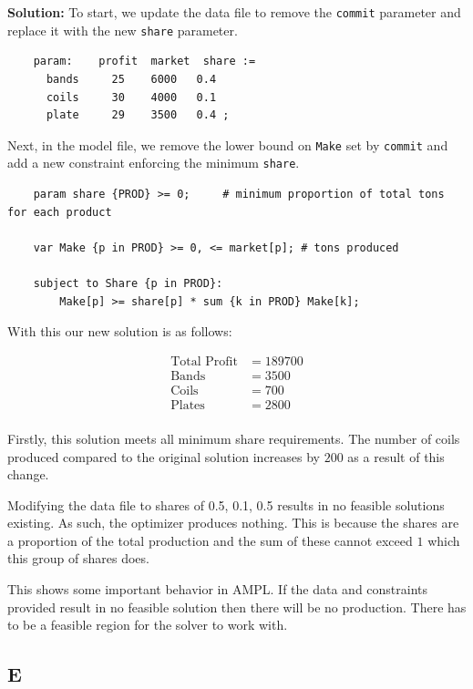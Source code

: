 \noindent\textbf{Solution:} To start, we update the data file to remove the \texttt{commit} parameter and replace it with the new \texttt{share} parameter. 

\begin{lstlisting}
	param:    profit  market  share :=
	  bands     25    6000   0.4
	  coils     30    4000   0.1
	  plate     29    3500   0.4 ;
\end{lstlisting}

Next, in the model file, we remove the lower bound on \texttt{Make} set by \texttt{commit} and add a new constraint enforcing the minimum \texttt{share}.

\begin{lstlisting}
	param share {PROD} >= 0;     # minimum proportion of total tons for each product

	var Make {p in PROD} >= 0, <= market[p]; # tons produced

	subject to Share {p in PROD}:
	    Make[p] >= share[p] * sum {k in PROD} Make[k];
\end{lstlisting}

With this our new solution is as follows:

\begin{align*}
	\text{Total Profit} &= 189700 \\
	\text{Bands} &= 3500 \\
	\text{Coils} &= 700 \\
	\text{Plates} &= 2800 \\
\end{align*}

Firstly, this solution meets all minimum share requirements. The number of coils produced compared to the original solution increases by $200$ as a result of this change. 

Modifying the data file to shares of 0.5, 0.1, 0.5 results in no feasible solutions existing. As such, the optimizer produces nothing. This is because the shares are a proportion of the total production and the sum of these cannot exceed $1$ which this group of shares does. 

This shows some important behavior in AMPL. If the data and constraints provided result in no feasible solution then there will be no production. There has to be a feasible region for the solver to work with. 

\subsection*{E}

